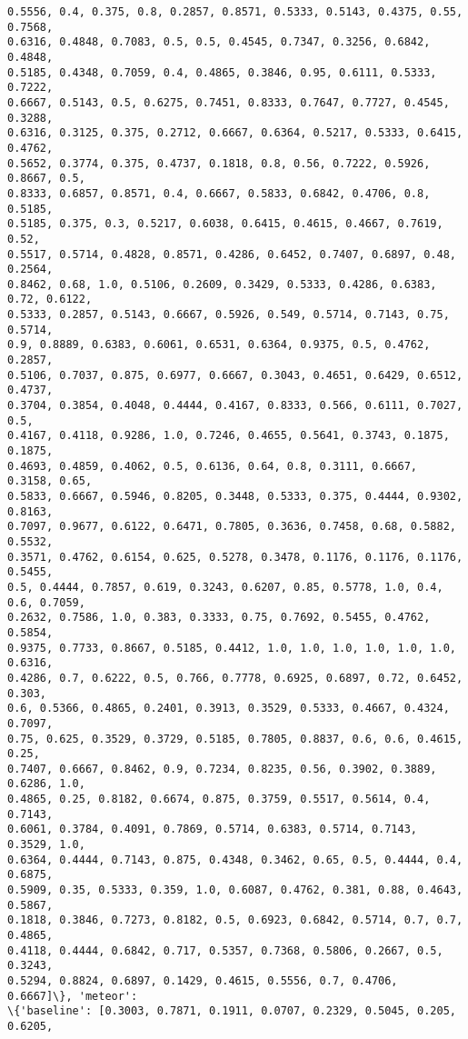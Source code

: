 \documentclass[11pt]{article}
\begin{document}
\begin{Verbatim}[commandchars=\\\{\}]
0.5556, 0.4, 0.375, 0.8, 0.2857, 0.8571, 0.5333, 0.5143, 0.4375, 0.55, 0.7568,
0.6316, 0.4848, 0.7083, 0.5, 0.5, 0.4545, 0.7347, 0.3256, 0.6842, 0.4848,
0.5185, 0.4348, 0.7059, 0.4, 0.4865, 0.3846, 0.95, 0.6111, 0.5333, 0.7222,
0.6667, 0.5143, 0.5, 0.6275, 0.7451, 0.8333, 0.7647, 0.7727, 0.4545, 0.3288,
0.6316, 0.3125, 0.375, 0.2712, 0.6667, 0.6364, 0.5217, 0.5333, 0.6415, 0.4762,
0.5652, 0.3774, 0.375, 0.4737, 0.1818, 0.8, 0.56, 0.7222, 0.5926, 0.8667, 0.5,
0.8333, 0.6857, 0.8571, 0.4, 0.6667, 0.5833, 0.6842, 0.4706, 0.8, 0.5185,
0.5185, 0.375, 0.3, 0.5217, 0.6038, 0.6415, 0.4615, 0.4667, 0.7619, 0.52,
0.5517, 0.5714, 0.4828, 0.8571, 0.4286, 0.6452, 0.7407, 0.6897, 0.48, 0.2564,
0.8462, 0.68, 1.0, 0.5106, 0.2609, 0.3429, 0.5333, 0.4286, 0.6383, 0.72, 0.6122,
0.5333, 0.2857, 0.5143, 0.6667, 0.5926, 0.549, 0.5714, 0.7143, 0.75, 0.5714,
0.9, 0.8889, 0.6383, 0.6061, 0.6531, 0.6364, 0.9375, 0.5, 0.4762, 0.2857,
0.5106, 0.7037, 0.875, 0.6977, 0.6667, 0.3043, 0.4651, 0.6429, 0.6512, 0.4737,
0.3704, 0.3854, 0.4048, 0.4444, 0.4167, 0.8333, 0.566, 0.6111, 0.7027, 0.5,
0.4167, 0.4118, 0.9286, 1.0, 0.7246, 0.4655, 0.5641, 0.3743, 0.1875, 0.1875,
0.4693, 0.4859, 0.4062, 0.5, 0.6136, 0.64, 0.8, 0.3111, 0.6667, 0.3158, 0.65,
0.5833, 0.6667, 0.5946, 0.8205, 0.3448, 0.5333, 0.375, 0.4444, 0.9302, 0.8163,
0.7097, 0.9677, 0.6122, 0.6471, 0.7805, 0.3636, 0.7458, 0.68, 0.5882, 0.5532,
0.3571, 0.4762, 0.6154, 0.625, 0.5278, 0.3478, 0.1176, 0.1176, 0.1176, 0.5455,
0.5, 0.4444, 0.7857, 0.619, 0.3243, 0.6207, 0.85, 0.5778, 1.0, 0.4, 0.6, 0.7059,
0.2632, 0.7586, 1.0, 0.383, 0.3333, 0.75, 0.7692, 0.5455, 0.4762, 0.5854,
0.9375, 0.7733, 0.8667, 0.5185, 0.4412, 1.0, 1.0, 1.0, 1.0, 1.0, 1.0, 0.6316,
0.4286, 0.7, 0.6222, 0.5, 0.766, 0.7778, 0.6925, 0.6897, 0.72, 0.6452, 0.303,
0.6, 0.5366, 0.4865, 0.2401, 0.3913, 0.3529, 0.5333, 0.4667, 0.4324, 0.7097,
0.75, 0.625, 0.3529, 0.3729, 0.5185, 0.7805, 0.8837, 0.6, 0.6, 0.4615, 0.25,
0.7407, 0.6667, 0.8462, 0.9, 0.7234, 0.8235, 0.56, 0.3902, 0.3889, 0.6286, 1.0,
0.4865, 0.25, 0.8182, 0.6674, 0.875, 0.3759, 0.5517, 0.5614, 0.4, 0.7143,
0.6061, 0.3784, 0.4091, 0.7869, 0.5714, 0.6383, 0.5714, 0.7143, 0.3529, 1.0,
0.6364, 0.4444, 0.7143, 0.875, 0.4348, 0.3462, 0.65, 0.5, 0.4444, 0.4, 0.6875,
0.5909, 0.35, 0.5333, 0.359, 1.0, 0.6087, 0.4762, 0.381, 0.88, 0.4643, 0.5867,
0.1818, 0.3846, 0.7273, 0.8182, 0.5, 0.6923, 0.6842, 0.5714, 0.7, 0.7, 0.4865,
0.4118, 0.4444, 0.6842, 0.717, 0.5357, 0.7368, 0.5806, 0.2667, 0.5, 0.3243,
0.5294, 0.8824, 0.6897, 0.1429, 0.4615, 0.5556, 0.7, 0.4706, 0.6667]\}, 'meteor':
\{'baseline': [0.3003, 0.7871, 0.1911, 0.0707, 0.2329, 0.5045, 0.205, 0.6205,

\end{Verbatim}
\end{document}
